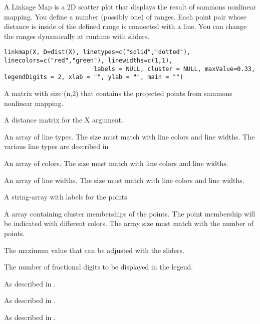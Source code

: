 \documentclass[letterpaper]{book}
\begin{document}
%
\begin{Description}\relax
A Linkage Map is a 2D scatter plot that displays the result of sammons nonlinear mapping. You define a number (possibly one) of ranges. Each point pair whose distance
is inside of the defined range is connected with a line. You can change the ranges dynamically
at runtime with sliders.
\end{Description}
%
\begin{Usage}
\begin{verbatim}
linkmap(X, D=dist(X), linetypes=c("solid","dotted"), linecolors=c("red","green"), linewidths=c(1,1),
						 labels = NULL, cluster = NULL, maxValue=0.33, legendDigits = 2, xlab = "", ylab = "", main = "")
\end{verbatim}
\end{Usage}
%
\begin{Arguments}
\begin{ldescription}
\item[\code{X}] 
A matrix with size (n,2) that contains the projected points from sammons nonlinear mapping.

\item[\code{D}] 
A distance matrix for the X argument. 

\item[\code{linetypes}] 
An array of line types. The size must match with line colors and line widths.
The various line types are described in 

\item[\code{linecolors}] 
An array of colors. The size must match with line colors and line widths.

\item[\code{linewidths}] 
An array of line widths. The size must match with line colors and line widths.

\item[\code{labels}] 
A string-array with labels for the points

\item[\code{cluster}] 
A array containing cluster memberships of the points. The point
membership will be indicated with different colors. The array size
must match with the number of points.

\item[\code{maxValue}] 
The maximum value that can be adjusted with the sliders.

\item[\code{legendDigits}] 
The number of fractional digits to be displayed in the legend.

\item[\code{xlab}] 
As described in .

\item[\code{ylab}] 
As described in .

\item[\code{main}] 
As described in .

\end{ldescription}
\end{Arguments}
\end{document}
